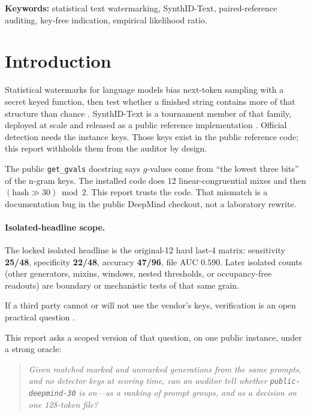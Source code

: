 \documentclass[11pt,a4paper]{article}
\theoremstyle{definition}
\begin{document}
\noindent\textbf{Keywords:}
statistical text watermarking, SynthID-Text, paired-reference auditing,
key-free indication, empirical likelihood ratio.

\section{Introduction}
\label{sec:intro}

Statistical watermarks for language models bias next-token sampling with
a secret keyed function, then test whether a finished string contains
more of that structure than chance \citep{kirchenbauer2023watermark,
aaronson2023watermark,dathathri2024synthid}. SynthID-Text is a tournament
member of that family, deployed at scale and released as a public
reference implementation
\citep{dathathri2024synthid,deepmind2024synthidcode}. Official detection
needs the instance keys. Those keys exist in the public reference code;
this report withholds them from the auditor by design.

The public \texttt{get\_gvals} docstring says $g$-values come from
``the lowest three bits'' of the n-gram keys. The installed code does
12 linear-congruential mixes and then $(\mathrm{hash}\gg 30)\bmod 2$.
This report trusts the code. That mismatch is a documentation bug in
the public DeepMind checkout, not a laboratory rewrite.

\paragraph{Isolated-headline scope.}
The locked isolated headline is the original-12 hard last-4 matrix:
sensitivity \textbf{25/48}, specificity \textbf{22/48}, accuracy
\textbf{47/96}, file AUC $0.590$. Later isolated counts (other
generators, mixins, windows, nested thresholds, or occupancy-free
readouts) are boundary or mechanistic tests of that same grain.

If a third party cannot or will not use the vendor's keys, verification
is an open practical question
\citep{deepmind2024issue22,gloaguen2025blackbox,wang2026ttp}.

This report asks a scoped version of that question, on one public
instance, under a strong oracle:

\begin{quote}
\emph{Given matched marked and unmarked generations from the same
prompts, and no detector keys at scoring time, can an auditor tell
whether \texttt{public-deepmind-30} is on---as a ranking of prompt
groups, and as a decision on one 128-token file?}
\end{quote}
\end{document}
